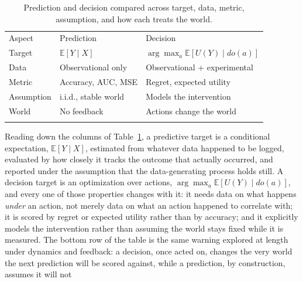 \begin{table}[!t]
  \caption{Prediction and decision compared across target, data, metric, assumption,
  and how each treats the world.}
  \label{tab:prediction-vs-decision-formally}
  \begin{tabular}{p{2.0cm}p{4.5cm}p{4.8cm}}
    \hline
    \noalign{\smallskip} Aspect                             & Prediction             & Decision                                  \\
    \noalign{\smallskip}\svhline\noalign{\smallskip} Target & $\mathbb{E}[Y \mid X]$ & $\arg\max_{a}\mathbb{E}[U(Y) \mid do(a)]$ \\
    Data                                                    & Observational only     & Observational + experimental              \\
    Metric                                                  & Accuracy, AUC, MSE     & Regret, expected utility                  \\
    Assumption                                              & i.i.d., stable world   & Models the intervention                   \\
    World                                                   & No feedback            & Actions change the world                  \\
    \noalign{\smallskip}                                     \hline
    \noalign{\smallskip}
  \end{tabular}
\end{table}

Reading down the columns of Table~\ref{tab:prediction-vs-decision-formally}, a predictive
target is a conditional expectation, $\mathbb{E}[Y \mid X]$, estimated from whatever
data happened to be logged, evaluated by how closely it tracks the outcome that
actually occurred, and reported under the assumption that the data-generating process
holds still. A decision target is an optimization over actions, $\arg\max_{a}\mathbb{E}
[U(Y) \mid do(a)]$, and every one of those properties changes with it: it needs data
on what happens \emph{under} an action, not merely data on what an action happened
to correlate with; it is scored by regret or expected utility rather than by
accuracy; and it explicitly models the intervention rather than assuming the world
stays fixed while it is measured. The bottom row of the table is the same
warning explored at length under dynamics and feedback: a decision, once acted
on, changes the very world the next prediction will be scored against, while a
prediction, by construction, assumes it will not

